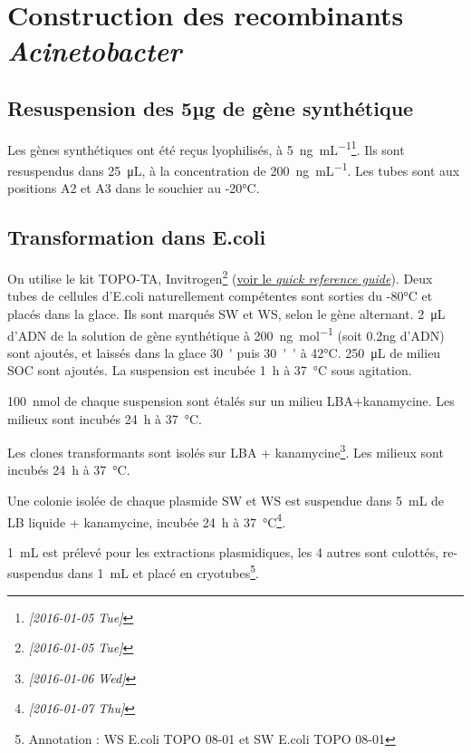 \documentclass[a4paper, justified]{tufte-handout}
\author{Samuel BARRETO}
\date{\today}
\title{}
\begin{document}
\tableofcontents


\section{Construction des recombinants \emph{Acinetobacter}}
\label{sec:orgheadline4}
\subsection{Resuspension des 5µg de gène synthétique}
\label{sec:orgheadline1}


Les gènes synthétiques ont été reçus lyophilisés, à
\SI{5}{\nano\g\per\milli\liter}\footnote{\textit{[2016-01-05 Tue]}}. Ils sont resuspendus
dans \SI{25}{\micro\liter}, à la concentration de
\SI{200}{\nano\g\per\milli\liter}. Les tubes sont aux positions A2 et A3 dans le
souchier au -20°C.

\subsection{Transformation dans E.coli}
\label{sec:orgheadline2}
On utilise le kit TOPO-TA, Invitrogen\footnote{\textit{[2016-01-05 Tue]}}
(\href{file:///Users/samuelbarreto/stage/doc/topota_cloning_kits.pdf}{voir le \emph{quick reference guide}}).
Deux tubes de cellules d'E.coli naturellement compétentes sont sorties du -80°C
et placés dans la glace. Ils sont marqués SW et WS, selon le gène alternant.
\SI{2}{\micro\liter} d'ADN de la solution de gène synthétique à
\SI{200}{\nano\gram\per\mol} (soit 0.2ng d'ADN) sont ajoutés, et laissés dans
la glace \si{30'} puis \si{30''} à 42°C. \si{250\micro\liter} de milieu SOC sont
ajoutés. La suspension est incubée \si{1\hour} à \si{37\celsius} sous agitation.

\SI{100}{\nano\mole} de chaque suspension sont étalés sur un milieu
LBA+kanamycine. Les milieux sont incubés \si{24\hour} à \si{37\celsius}. 


Les clones transformants sont isolés sur LBA +
kanamycine\footnote{\textit{[2016-01-06 Wed]}}. Les milieux sont incubés \si{24\hour} à
\si{37\celsius}.

Une colonie isolée de chaque plasmide SW et WS est suspendue dans
\si{5\milli\liter} de LB liquide + kanamycine, incubée \si{24\hour} à
\si{37\celsius}\footnote{\textit{[2016-01-07 Thu]}}.

\si{1\milli\liter} est prélevé pour les extractions
plasmidiques\footnotemark[4]{}, les 4 autres sont culottés, re-suspendus
dans \si{1\milli\liter} et placé en cryotubes\footnote{Annotation : WS E.coli TOPO
08-01 et SW E.coli TOPO 08-01}.
\end{document}
